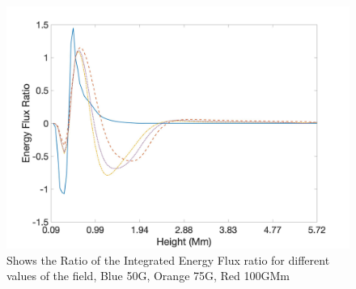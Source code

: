 \documentclass[linenumbers]{aastex63}
\begin{document}


\begin{figure}
    \label{energyfluxratio_50G_75G_100G_line}
    \centering
    \includegraphics[scale=0.425]{energyfluxratio.jpg}
    \caption{Shows the Ratio of the Integrated Energy Flux ratio for different values of the field, Blue 50G, Orange 75G, Red 100GMm}
\end{figure}
\end{document}
